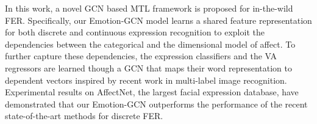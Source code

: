 \documentclass[a4paper, 10pt, conference]{ieeeconf}      \usepackage{FG2021}
\begin{document}
In this work, a novel GCN based MTL framework is proposed for in-the-wild FER. Specifically, our Emotion-GCN model learns a shared feature representation for both discrete and continuous expression recognition to exploit the dependencies between the categorical and the dimensional model of affect. To further capture these dependencies, the expression classifiers and the VA regressors are learned though a GCN that maps their word representation to dependent vectors inspired by recent work in multi-label image recognition. Experimental results on AffectNet, the largest facial expression database, have demonstrated that our Emotion-GCN outperforms the performance of the recent state-of-the-art methods for discrete FER.

\addtolength{\textheight}{0cm}   

{\small


}
\end{document}
